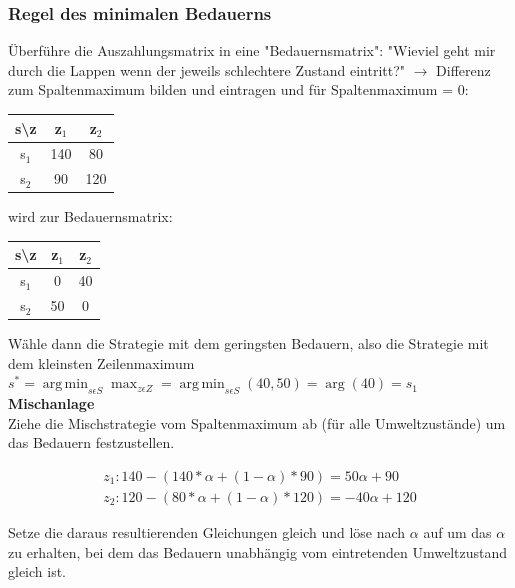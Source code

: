 \documentclass[11pt]{article}
\DeclareMathOperator*{\argmin}{arg\,min}
\begin{document}
\subsubsection{Regel des minimalen Bedauerns}
\label{sec:orgac2b4c4}
Überführe die Auszahlungsmatrix in eine "Bedauernsmatrix": "Wieviel geht mir durch die Lappen wenn der jeweils schlechtere Zustand eintritt?" \(\rightarrow\) Differenz zum Spaltenmaximum bilden und eintragen und für Spaltenmaximum = 0:\\
\begin{center}
\begin{tabular}{c|c|c}
s\textbackslash{z} & z\(_{\text{1}}\) & z\(_{\text{2}}\)\\
\hline
s\(_{\text{1}}\) & 140 & 80\\
s\(_{\text{2}}\) & 90 & 120\\
\end{tabular}
\end{center}
wird zur Bedauernsmatrix:
\begin{center}
\begin{tabular}{c|c|c}
s\textbackslash{z} & z\(_{\text{1}}\) & z\(_{\text{2}}\)\\
\hline
s\(_{\text{1}}\) & 0 & 40\\
s\(_{\text{2}}\) & 50 & 0\\
\end{tabular}
\end{center}
Wähle dann die Strategie mit dem geringsten Bedauern, also die Strategie mit dem kleinsten Zeilenmaximum\\
\(\displaystyle s^* = \argmin_{s \epsilon S}\max_{z \epsilon Z} = \argmin_{s \epsilon S}(40, 50) = \arg(40) = s_1\)
\newline\\
\textbf{Mischanlage}\\
Ziehe die Mischstrategie vom Spaltenmaximum ab (für alle Umweltzustände) um das Bedauern festzustellen.

\begin{equation*}
\begin{aligned}
z_1: 140 - (140*\alpha + (1-\alpha)*90) = 50\alpha +90 \\
z_2: 120 - (80*\alpha + (1-\alpha)*120) = -40\alpha+120
\end{aligned}
\end{equation*}

Setze die daraus resultierenden Gleichungen gleich und löse nach \(\alpha\) auf um das \(\alpha\) zu erhalten, bei dem das Bedauern unabhängig vom eintretenden Umweltzustand gleich ist.
\end{document}
